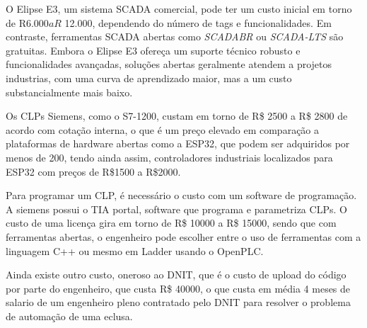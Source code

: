 \begin{anexosenv}
O Elipse E3, um sistema SCADA comercial, pode ter um custo inicial em torno de R$ 6.000 a R$ 12.000, dependendo do número de tags e funcionalidades. Em contraste, ferramentas SCADA abertas como \textit{SCADABR} ou \textit{SCADA-LTS} são gratuitas. Embora o Elipse E3 ofereça um suporte técnico robusto e funcionalidades avançadas, soluções abertas geralmente atendem a projetos industrias, com uma curva de aprendizado maior, mas a um custo substancialmente mais baixo.

Os CLPs Siemens, como o S7-1200, custam em torno de R\$ 2500 a R\$ 2800 de acordo com cotação interna, o que é um preço elevado em comparação a plataformas de hardware abertas como a ESP32, que podem ser adquiridos por menos de 200, tendo ainda assim, controladores industriais localizados para ESP32 com preços de R\$1500 a R\$2000. 

Para programar um CLP, é necessário o custo com um software de programação. A siemens possui o TIA portal, software que programa e parametriza CLPs. O custo de uma licença gira em torno de R\$ 10000 a R\$ 15000, sendo que com ferramentas abertas, o engenheiro pode escolher entre o uso de ferramentas com a linguagem C++ ou mesmo em Ladder usando o OpenPLC.

Ainda existe outro custo, oneroso ao DNIT, que é o custo de upload do código por parte do engenheiro, que custa R\$ 40000, o que custa em média 4 meses de salario de um engenheiro pleno contratado pelo DNIT para resolver o problema de automação de uma eclusa.  


\end{anexosenv}

